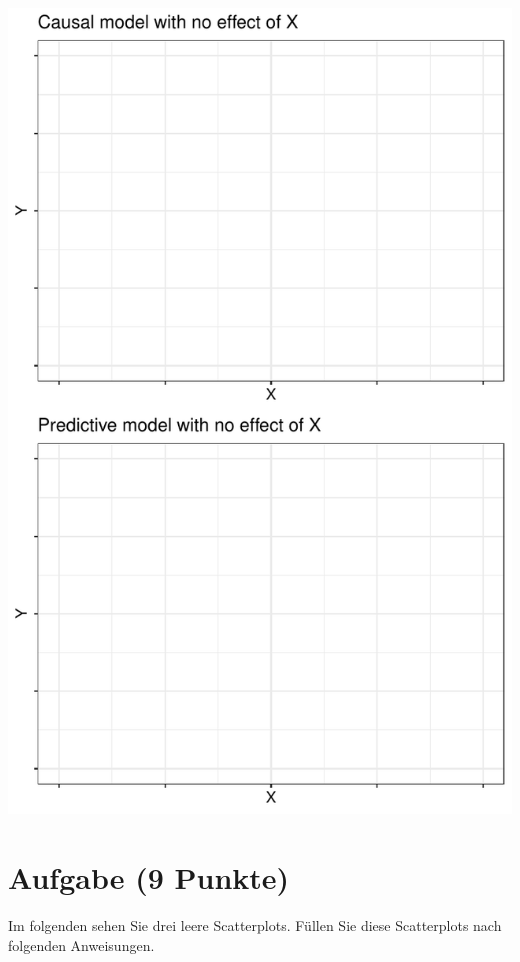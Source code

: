 \documentclass[a4paper, 10pt]{scrartcl}\usepackage[]{graphicx}\usepackage[]{xcolor}
\makeatletter
\def\maxwidth{ %
  \ifdim\Gin@nat@width>\linewidth
    \linewidth
  \else
    \Gin@nat@width
  \fi
}
\makeatother
\begin{document}
{\centering \includegraphics[width=\maxwidth]{img/modeling-01-1} 

}



 
\clearpage

\section{Aufgabe \hfill (9 Punkte)}

Im folgenden sehen Sie drei leere Scatterplots. F{\"u}llen Sie diese
Scatterplots nach folgenden Anweisungen.
\end{document}
